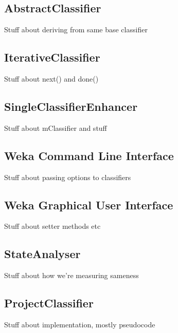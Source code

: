 \subsection{AbstractClassifier}
Stuff about deriving from same base classifier
\subsection{IterativeClassifier}
Stuff about next() and done()
\subsection{SingleClassifierEnhancer}
Stuff about mClassifier and stuff

\subsection{Weka Command Line Interface}
Stuff about passing options to classifiers
\subsection{Weka Graphical User Interface}
Stuff about setter methods etc
\subsection{StateAnalyser}
Stuff about how we're measuring sameness
\subsection{ProjectClassifier}
Stuff about implementation, mostly pseudocode
